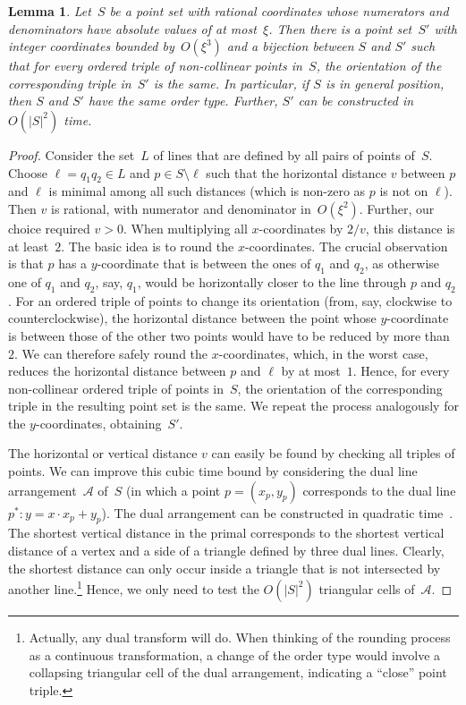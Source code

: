 \documentclass[a4paper,11pt]{article}
\newtheorem{lemma}[theorem]{Lemma}
\begin{document}
\begin{lemma}\label{lem_integer_coordinates}
Let~$S$ be a point set with rational coordinates whose numerators and denominators have absolute values of at most~$\xi$.
Then there is a point set~$S'$ with integer coordinates bounded by~$O(\xi^3)$ and a bijection between $S$ and $S'$ such that for every ordered triple of non-collinear points in~$S$, the orientation of the corresponding triple in~$S'$ is the same.
In particular, if $S$ is in general position, then $S$ and $S'$ have the same order type.
Further, $S'$ can be constructed in $O(|S|^2)$ time.
\end{lemma}
\begin{proof}
Consider the set~$L$ of lines that are defined by all pairs of points of~$S$.
Choose $\ell = q_1 q_2 \in L$ and $p \in S \setminus \ell$ such that the horizontal distance $v$ between $p$ and $\ell$ is minimal among all such distances (which is non-zero as $p$ is not on $\ell$). Then $v$ is rational, with numerator and denominator in~$O(\xi^2)$.
Further, our choice required $v > 0$.
When multiplying all $x$-coordinates by $2/v$, this distance is at least~$2$.
The basic idea is to round the $x$-coordinates.
The crucial observation is that $p$ has a $y$-coordinate that is between the ones of $q_1$ and $q_2$, as otherwise one of $q_1$ and $q_2$, say, $q_1$, would be horizontally closer to the line through $p$ and $q_2$.
For an ordered triple of points to change its orientation (from, say, clockwise to counterclockwise), the horizontal distance between the point whose $y$-coordinate is between those of the other two points would have to be reduced by more than~$2$.
We can therefore safely round the $x$-coordinates, which, in the worst case, reduces the horizontal distance between $p$ and $\ell$ by at most~$1$.
Hence, for every non-collinear ordered triple of points in~$S$, the orientation of the corresponding triple in the resulting point set is the same.
We repeat the process analogously for the $y$-coordinates, obtaining~$S'$.

The horizontal or vertical distance $v$ can easily be found by checking all triples of points.
We can improve this cubic time bound by considering the dual line arrangement~$\mathcal{A}$ of~$S$ (in which a point $p = (x_p, y_p)$ corresponds to the dual line $p^* : y = x \cdot x_p + y_p$).
The dual arrangement can be constructed in quadratic time~\cite{power_of_duality,constructing_arrangements}.
The shortest vertical distance in the primal corresponds to the shortest vertical distance of a vertex and a side of a triangle defined by three dual lines.
Clearly, the shortest distance can only occur inside a triangle that is not intersected by another line.\footnote{Actually, any dual transform will do.
When thinking of the rounding process as a continuous transformation, a change of the order type would involve a collapsing triangular cell of the dual arrangement, indicating a ``close'' point triple.}
Hence, we only need to test the $O(|S|^2)$ triangular cells of~$\mathcal{A}$.
\end{proof}
\end{document}
